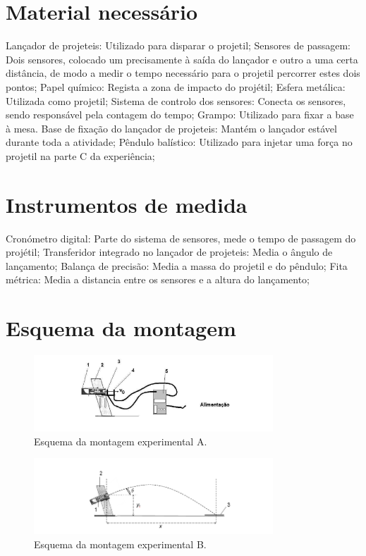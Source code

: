 \documentclass{report}
\begin{document}
\section{Material necessário}

Lançador de projeteis: Utilizado para disparar o projetil;
	Sensores de passagem: Dois sensores, colocado um precisamente à saída do lançador e outro a uma certa distância, de modo a medir o tempo necessário para o projetil percorrer estes dois pontos;
	Papel químico: Regista a zona de impacto do projétil;
	Esfera metálica: Utilizada como projetil;
	Sistema de controlo dos sensores: Conecta os sensores, sendo responsável pela contagem do tempo;
	Grampo: Utilizado para fixar a base à mesa.
	Base de fixação do lançador de projeteis: Mantém o lançador estável durante toda a atividade;
	Pêndulo balístico: Utilizado para injetar uma força no projetil na parte C da experiência;

\section{Instrumentos de medida}
	Cronómetro digital: Parte do sistema de sensores, mede o tempo de passagem do projétil;
	Transferidor integrado no lançador de projeteis: Media o ângulo de lançamento;
	Balança de precisão: Media a massa do projetil e do pêndulo;
	Fita métrica: Media a distancia entre os sensores e a altura do lançamento;

\section{Esquema da montagem}
\begin{figure}[H]
    \centering
    \includegraphics[width=0.8\textwidth]{image.png} %
    \caption{Esquema da montagem experimental A.}
    \label{fig:montagem}
\end{figure}

\begin{figure}[H]
    \centering
    \includegraphics[width=0.8\textwidth]{image2.png} %
    \caption{Esquema da montagem experimental B.}
    \label{fig:montagem}
\end{figure}
\end{document}
